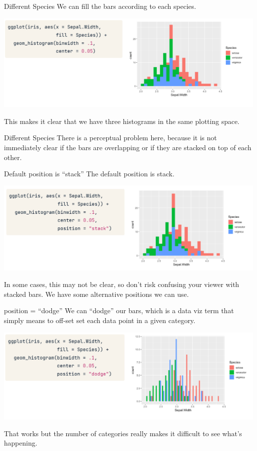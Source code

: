 \documentclass[
  ignorenonframetext,
]{beamer}
\begin{document}
\begin{frame}{Different Species}
\label{different-species-1}
We can fill the bars according to each species.

\includegraphics{../images/im203.png}

This makes it clear that we have three histograms in the same plotting
space.
\end{frame}

\begin{frame}{Different Species}
\label{different-species-2}
There is a perceptual problem here, because it is not immediately clear
if the bars are overlapping or if they are stacked on top of each other.
\end{frame}

\begin{frame}{Default position is ``stack''}
\label{default-position-is-stack}
The default position is stack.

\includegraphics{../images/im204.png}

In some cases, this may not be clear, so don't risk confusing your
viewer with stacked bars. We have some alternative positions we can use.
\end{frame}

\begin{frame}{position = ``dodge''}
\label{position-dodge}
We can ``dodge'' our bars, which is a data viz term that simply means to
off-set set each data point in a given category.

\includegraphics{../images/im205.png}

That works but the number of categories really makes it difficult to see
what's happening.
\end{frame}
\end{document}

